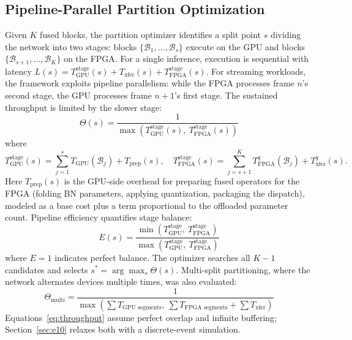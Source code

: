 \documentclass[runningheads]{llncs}
\begin{document}
\subsection{Pipeline-Parallel Partition Optimization}\label{sec:partition}

Given $K$ fused blocks, the partition optimizer identifies a split point $s$ dividing the network into two stages: blocks $\{\mathcal{B}_1, \ldots, \mathcal{B}_s\}$ execute on the GPU and blocks $\{\mathcal{B}_{s+1}, \ldots, \mathcal{B}_K\}$ on the FPGA. For a single inference, execution is sequential with latency $L(s) = T_{\text{GPU}}^{\text{stage}}(s) + T_{\text{xfer}}(s) + T_{\text{FPGA}}^{\text{stage}}(s)$. For streaming workloads, the framework exploits pipeline parallelism: while the FPGA processes frame $n$'s second stage, the GPU processes frame $n+1$'s first stage. The sustained throughput is limited by the slower stage:
\begin{equation}\label{eq:throughput}
    \Theta(s) = \frac{1}{\max\left(T_{\text{GPU}}^{\text{stage}}(s),\ T_{\text{FPGA}}^{\text{stage}}(s)\right)}
\end{equation}
where
\begin{equation}
    T_{\text{GPU}}^{\text{stage}}(s) = \sum_{j=1}^{s} T_{\text{GPU}}(\mathcal{B}_j) + T_{\text{prep}}(s),\quad
    T_{\text{FPGA}}^{\text{stage}}(s) = \sum_{j=s+1}^{K} T_{\text{FPGA}}^{q}(\mathcal{B}_j) + T_{\text{xfer}}^{q}(s).
\end{equation}
Here $T_{\text{prep}}(s)$ is the GPU-side overhead for preparing fused operators for the FPGA (folding BN parameters, applying quantization, packaging the dispatch), modeled as a base cost plus a term proportional to the offloaded parameter count. Pipeline efficiency quantifies stage balance:
\begin{equation}\label{eq:efficiency}
    E(s) = \frac{\min\left(T_{\text{GPU}}^{\text{stage}},\ T_{\text{FPGA}}^{\text{stage}}\right)}{\max\left(T_{\text{GPU}}^{\text{stage}},\ T_{\text{FPGA}}^{\text{stage}}\right)}
\end{equation}
where $E = 1$ indicates perfect balance. The optimizer searches all $K-1$ candidates and selects $s^* = \arg\max_s \Theta(s)$. Multi-split partitioning, where the network alternates devices multiple times, was also evaluated:
\begin{equation}
    \Theta_{\text{multi}} = \frac{1}{\max\left(\sum T_{\text{GPU segments}},\ \sum T_{\text{FPGA segments}} + \sum T_{\text{xfer}}\right)}
\end{equation}
Equations~\eqref{eq:throughput} assume perfect overlap and infinite buffering; Section~\ref{sec:e10} relaxes both with a discrete-event simulation.
\end{document}

